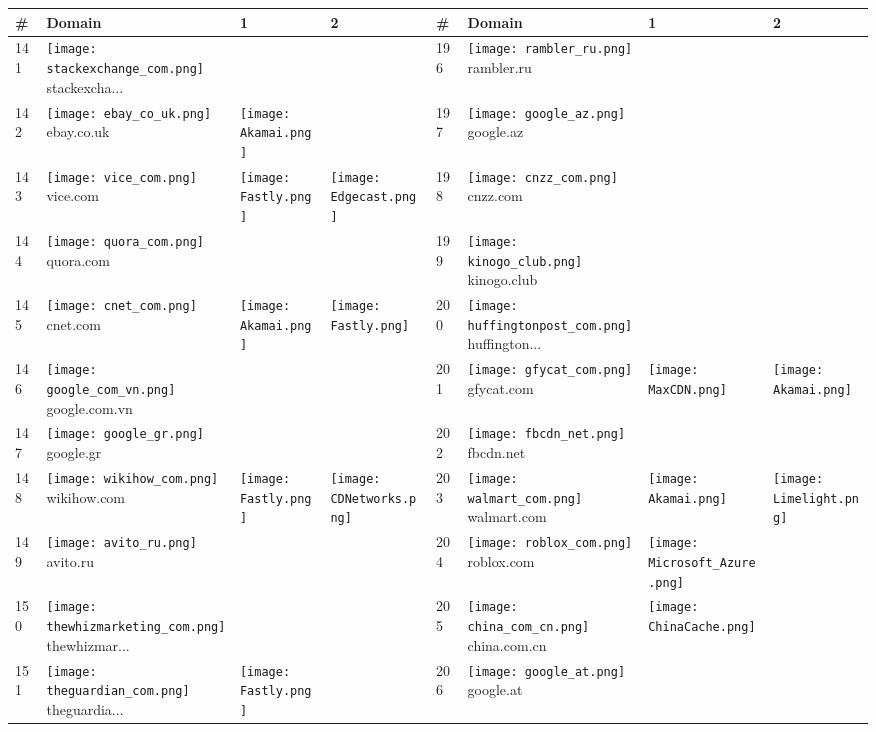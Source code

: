 \begin{table}[]
\centering
\begin{tabular}{|llll|llll|}
\hline
\# & Domain & 1 & 2 & \# & Domain & 1 & 2 \\
\hline
141 & \texttt{[image: stackexchange\_com.png]} stackexcha... & & & 196 & \texttt{[image: rambler\_ru.png]} rambler.ru & & \\
142 & \texttt{[image: ebay\_co\_uk.png]} ebay.co.uk & \texttt{[image: Akamai.png]} & & 197 & \texttt{[image: google\_az.png]} google.az & & \\
143 & \texttt{[image: vice\_com.png]} vice.com & \texttt{[image: Fastly.png]} & \texttt{[image: Edgecast.png]} & 198 & \texttt{[image: cnzz\_com.png]} cnzz.com & & \\
144 & \texttt{[image: quora\_com.png]} quora.com & & & 199 & \texttt{[image: kinogo\_club.png]} kinogo.club & & \\
145 & \texttt{[image: cnet\_com.png]} cnet.com & \texttt{[image: Akamai.png]} & \texttt{[image: Fastly.png]} & 200 & \texttt{[image: huffingtonpost\_com.png]} huffington... & & \\
146 & \texttt{[image: google\_com\_vn.png]} google.com.vn & & & 201 & \texttt{[image: gfycat\_com.png]} gfycat.com & \texttt{[image: MaxCDN.png]} & \texttt{[image: Akamai.png]} \\
147 & \texttt{[image: google\_gr.png]} google.gr & & & 202 & \texttt{[image: fbcdn\_net.png]} fbcdn.net & & \\
148 & \texttt{[image: wikihow\_com.png]} wikihow.com & \texttt{[image: Fastly.png]} & \texttt{[image: CDNetworks.png]} & 203 & \texttt{[image: walmart\_com.png]} walmart.com & \texttt{[image: Akamai.png]} & \texttt{[image: Limelight.png]} \\
149 & \texttt{[image: avito\_ru.png]} avito.ru & & & 204 & \texttt{[image: roblox\_com.png]} roblox.com & \texttt{[image: Microsoft\_Azure.png]} & \\
150 & \texttt{[image: thewhizmarketing\_com.png]} thewhizmar... & & & 205 & \texttt{[image: china\_com\_cn.png]} china.com.cn & \texttt{[image: ChinaCache.png]} & \\
151 & \texttt{[image: theguardian\_com.png]} theguardia... & \texttt{[image: Fastly.png]} & & 206 & \texttt{[image: google\_at.png]} google.at & & \\

\end{tabular}
\end{table}
